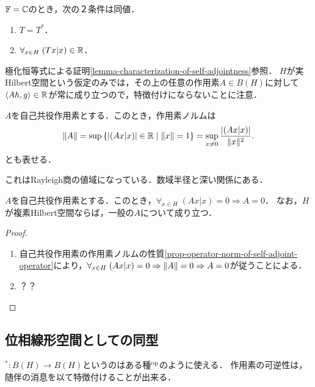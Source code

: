 \documentclass[uplatex,dvipdfmx]{jsreport}
\begin{document}
\begin{corollary}[自己共役作用素の特徴付け]
    $\mathbb{F}=\mathbb{C}$のとき，次の２条件は同値．
    \begin{enumerate}
        \item $T=T^*$．
        \item $\forall_{x\in H}\;(Tx|x)\in\mathbb{R}$．
    \end{enumerate}
\end{corollary}
\begin{remark}
    極化恒等式による証明\ref{lemma-characterization-of-self-adjointness}参照．
    $H$が実Hilbert空間という仮定のみでは，その上の任意の作用素$A\in B(H)$に対して$\langle Ah,g\rangle\in\mathbb{R}$が常に成り立つので，特徴付けにならないことに注意．
\end{remark}

\begin{proposition}[自己共役作用素の作用素ノルム]\label{prop-operator-norm-of-self-adjoint-operator}
    $A$を自己共役作用素とする．このとき，作用素ノルムは
    \[\|A\|=\sup\left\{\lvert(Ax|x)\rvert\in\mathbb{R}\mid\|x\|=1\right\}=\sup_{x\ne0}\frac{\lvert(Ax|x)\rvert}{\|x\|^2}.\]
    とも表せる．
\end{proposition}
\begin{remarks}[数域]
    これはRayleigh商の値域になっている．数域半径と深い関係にある．
\end{remarks}

\begin{corollary}[半内積の非退化性]\label{cor-nondegeneratedness-of-semi-inner-product}
    $A$を自己共役作用素とする．このとき，$\forall_{x\in H}\;(Ax|x)=0\Rightarrow A=0$．
    なお，$H$が複素Hilbert空間ならば，一般の$A$について成り立つ．
\end{corollary}
\begin{proof}\mbox{}
    \begin{enumerate}
        \item 自己共役作用素の作用素ノルムの性質\ref{prop-operator-norm-of-self-adjoint-operator}により，$\forall_{x\in H}\;(Ax|x)=0\Rightarrow\|A\|=0\Rightarrow A=0$が従うことによる．
        \item ？？
    \end{enumerate}
\end{proof}

\subsection{位相線形空間としての同型}

\begin{tcolorbox}[colframe=ForestGreen, colback=ForestGreen!10!white,breakable,colbacktitle=ForestGreen!40!white,coltitle=black,fonttitle=\bfseries\sffamily,
title=]
    ${}^*:B(H)\to B(H)$というのはある種${}^{\mathrm{op}}$のように使える．
    作用素の可逆性は，随伴の消息を以て特徴付けることが出来る．
\end{tcolorbox}
\end{document}
